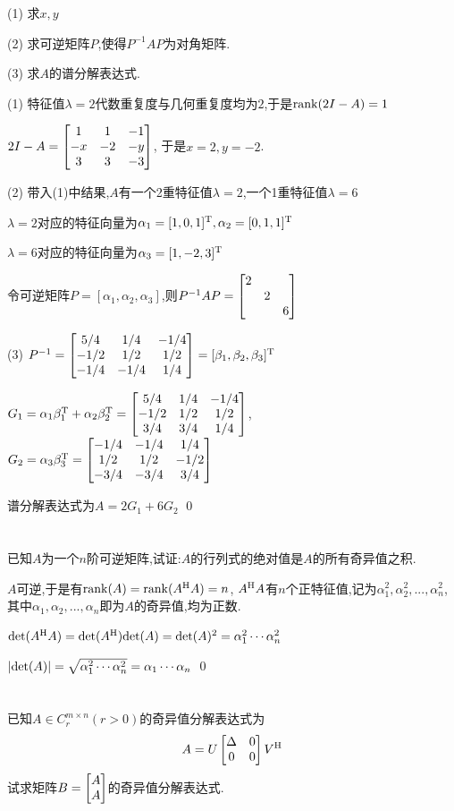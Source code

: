 \documentclass{matrix-homework}
\begin{document}
(1) 求$x,y$

(2) 求可逆矩阵$P$,使得$P^{-1}AP$为对角矩阵.

(3) 求$A$的谱分解表达式.

\answer
(1) 特征值$\lambda=2$代数重复度与几何重复度均为$2$,于是$\mathrm{rank}(2I-A)=1$

$2I-A=\begin{bmatrix}1&1&-1\\ -x&-2&-y\\ 3&3&-3\end{bmatrix}$, 于是$x=2, y=-2$.

(2) 带入(1)中结果,$A$有一个2重特征值$\lambda=2$,一个1重特征值$\lambda=6$

$\lambda=2$对应的特征向量为$\alpha_1=[1,0,1]^{\mathrm{T}},\alpha_2=[0,1,1]^{\mathrm{T}}$

$\lambda=6$对应的特征向量为$\alpha_3=[1,-2,3]^{\mathrm{T}}$

令可逆矩阵$P=[\alpha_1,\alpha_2,\alpha_3]$,则$P^{-1}AP=\begin{bmatrix}2\\&2\\&&6\end{bmatrix}$

(3) $P^{-1}=\begin{bmatrix}5/4 & 1/4 & -1/4 \\ -1/2 & 1/2 & 1/2 \\ -1/4 & -1/4 & 1/4\end{bmatrix}=[\beta_1,\beta_2,\beta_3]^{\mathrm{T}}$

$G_1=\alpha_1\beta_1^{\mathrm{T}}+\alpha_2\beta_2^{\mathrm{T}}=\begin{bmatrix}5/4& 1/4& -1/4\\ -1/2& 1/2& 1/2\\ 3/4& 3/4& 1/4\end{bmatrix}$, $G_2=\alpha_3\beta_3^{\mathrm{T}}=\begin{bmatrix}-1/4& -1/4& 1/4\\ 1/2& 1/2& -1/2\\ -3/4& -3/4& 3/4\end{bmatrix}$

谱分解表达式为$A=2G_1+6G_2$
\qed

\newpage
\section{}
\newcommand{\Det}[1]{\mr{det}(#1)}
已知$A$为一个$n$阶可逆矩阵,试证:$A$的行列式的绝对值是$A$的所有奇异值之积.

\answer
$A$可逆,于是有$\mathrm{rank}(A)=\mathrm{rank}(A^{\mathrm{H}} A)=n$, $A^{\mathrm{H}} A$有$n$个正特征值,记为$\alpha_1^2,\alpha_2^2,...,\alpha_n^2$, 其中$\alpha_1,\alpha_2,...,\alpha_n$即为$A$的奇异值,均为正数.

$\Det{A^\HH A} = \Det{A^\HH}\Det{A} = \Det{A}^2 = \alpha_1^2\cdots\alpha_n^2$

$|\Det{A}|=\sqrt{\alpha_1^2\cdots\alpha_n^2}=\alpha_1\cdots\alpha_n$
\qed


\section{}
已知$A\in C_r^{m\times n}(r>0)$的奇异值分解表达式为$$A=U\begin{bmatrix}\Delta& 0\\ 0&0\end{bmatrix}V^{\mathrm{H}}$$试求矩阵$B=\begin{bmatrix}A\\A\end{bmatrix}$的奇异值分解表达式.
\end{document}
